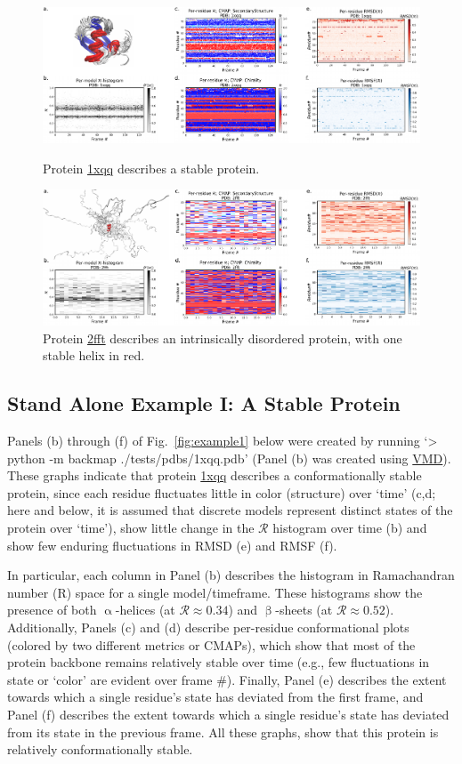 \documentclass[fleqn,10pt,lineno]{wlpeerj} %
\newcommand{\Fig}[1]{Fig.~\ref{#1}}
\newcommand{\rr}{$\mathcal{R}$\xspace}
\begin{document}
\begin{figure}[t!]
\includegraphics[width=1.0\linewidth]{figures/1xqq_spread.pdf}
\caption{Protein \href{https://www.rcsb.org/structure/1XQQ}{1xqq} describes a stable protein.\label{fig:example1}} 
\includegraphics[width=1.0\linewidth]{figures/2fft_spread.pdf}
\caption{Protein \href{https://www.rcsb.org/structure/2FFT}{2fft} describes an intrinsically disordered protein, with one stable helix in red.\label{fig:example2}} 
\end{figure}

\subsection*{Stand Alone Example I: A Stable Protein}

Panels (b) through (f) of \Fig{fig:example1} below were created by running `> python -m backmap ./tests/pdbs/1xqq.pdb' (Panel (b) was created using \href{http://www.ks.uiuc.edu/Research/vmd/}{VMD}). These graphs indicate that protein \href{https://www.rcsb.org/structure/1XQQ}{1xqq} describes a conformationally stable protein, since each residue fluctuates little in color (structure) over `time' (c,d; here and below, it is assumed that discrete models represent distinct states of the protein over `time'), show little change in the \rr histogram over time (b) and show few enduring fluctuations in RMSD (e) and RMSF (f). 

In particular, each column in Panel (b) describes the histogram in Ramachandran number (R) space for a single model/timeframe. These histograms show the presence of both $\upalpha$-helices (at $\mathcal{R} \approx 0.34$) and $\upbeta$-sheets (at $\mathcal{R} \approx 0.52$). Additionally, Panels (c) and (d) describe per-residue conformational plots (colored by two different metrics or CMAPs), which show that most of the protein backbone remains relatively stable over time (e.g., few fluctuations in state or `color' are evident over frame \#). Finally, Panel (e) describes the extent towards which a single residue's state has deviated from the first frame, and Panel (f) describes the extent towards which a single residue's state has deviated from its state in the previous frame. All these graphs, show that this protein is relatively conformationally stable.
\end{document}
